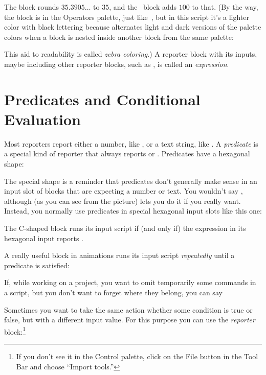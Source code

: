 \documentclass{report}
\begin{document}
The  block rounds $35.3905\ldots$ to $35$, and the \code{+}~block adds $100$ to that. (By the way, the  block is in the Operators palette, just like~\code{+}, but in this script it's a lighter color with black lettering because \Snap{} alternates light and dark versions of the palette colors when a block is nested inside another block from the same palette:


This aid to readability is called \emph{zebra coloring}.) A reporter block with its inputs, maybe including other reporter blocks, such as , is called an \emph{expression}.

\section{Predicates and Conditional Evaluation}

Most reporters report either a number, like , or a text string, like . A \emph{predicate} is a special kind of reporter that always reports  or . Predicates have a hexagonal shape:


The special shape is a reminder that predicates don't generally make sense in an input slot of blocks that are expecting a number or text. You wouldn't say , although (as you can see from the picture) \Snap{} lets you do it if you really want. Instead, you normally use predicates in special hexagonal input slots like this one:


The C-shaped  block runs its input script if (and only if) the expression in its hexagonal input reports .


A really useful block in animations runs its input script \emph{repeatedly} until a predicate is satisfied:


If, while working on a project, you want to omit temporarily some commands in a script, but you don't want to forget where they belong, you can say


Sometimes you want to take the same action whether some condition is true or false, but with a different input value. For this purpose you can use the \emph{reporter}  block:\footnote{\onehalfspacing If you don't see it in the Control palette, click on the File button  in the Tool Bar and choose ``Import tools.''}
\end{document}
